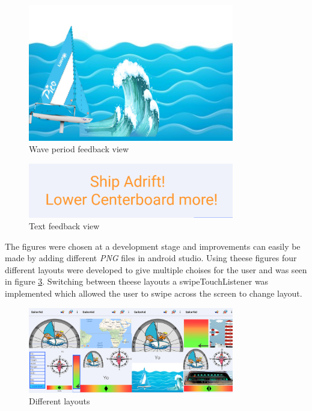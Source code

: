 \begin{figure}[H]
\centering
\includegraphics[width=0.8\textwidth]{Figures/wave.png}
\caption{Wave period feedback view}
\label{feedback-wave}
\end{figure}
\begin{figure}[H]
\centering
\includegraphics[width=0.8\textwidth]{Figures/text.png}
\caption{Text feedback view}
\label{feedback-text}
\end{figure}
The figures were chosen at a development stage and improvements can easily be made by adding different \textit{PNG}\cite{png} files in android studio.
Using theese figures four different layouts were developed to give multiple choises for the user and was seen in figure \ref{feedback-layouts}. Switching between theese layouts a swipeTouchListener was implemented which allowed the user to swipe across the screen to change layout.

\begin{figure}[H]
\centering
\includegraphics[width=0.8\textwidth]{Figures/layouts.png}
\caption{Different layouts}
\label{feedback-layouts}
\end{figure}

